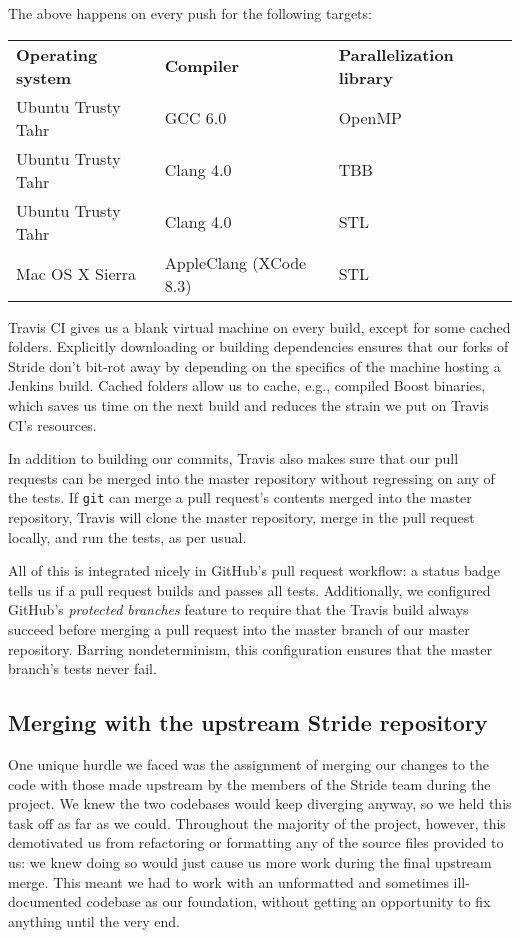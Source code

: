 \documentclass[a4paper,12pt]{article}
\begin{document}
\pagebreak
The above happens on every push for the following targets:

\begin{tabular}{l|l|l}
	\textbf{Operating system} & \textbf{Compiler} & \textbf{Parallelization library} \\
	Ubuntu Trusty Tahr & GCC 6.0 & OpenMP \\
	Ubuntu Trusty Tahr & Clang 4.0 & TBB \\
	Ubuntu Trusty Tahr & Clang 4.0 & STL \\
	Mac OS X Sierra & AppleClang (XCode 8.3) & STL \\
\end{tabular}

Travis CI gives us a blank virtual machine on every build, except for some cached folders. Explicitly downloading or building dependencies ensures that our forks of Stride don't bit-rot away by depending on the specifics of the machine hosting a Jenkins build. Cached folders allow us to cache, e.g., compiled Boost binaries, which saves us time on the next build and reduces the strain we put on Travis CI's resources.

In addition to building our commits, Travis also makes sure that our pull requests can be merged into the master repository without regressing on any of the tests. If \texttt{git} can merge a pull request's contents merged into the master repository, Travis will clone the master repository, merge in the pull request locally, and run the tests, as per usual.

All of this is integrated nicely in GitHub's pull request workflow: a status badge tells us if a pull request builds and passes all tests. Additionally, we configured GitHub's \emph{protected branches} feature to require that the Travis build always succeed before merging a pull request into the master branch of our master repository. Barring nondeterminism, this configuration ensures that the master branch's tests never fail.

\subsection{Merging with the upstream Stride repository}
One unique hurdle we faced was the assignment of merging our changes to the code with those made upstream by the members of the Stride team during the project. We knew the two codebases would keep diverging anyway, so we held this task off as far as we could. Throughout the majority of the project, however, this demotivated us from refactoring or formatting any of the source files provided to us: we knew doing so would just cause us more work during the final upstream merge. This meant we had to work with an unformatted and sometimes ill-documented codebase as our foundation, without getting an opportunity to fix anything until the very end.
\end{document}
